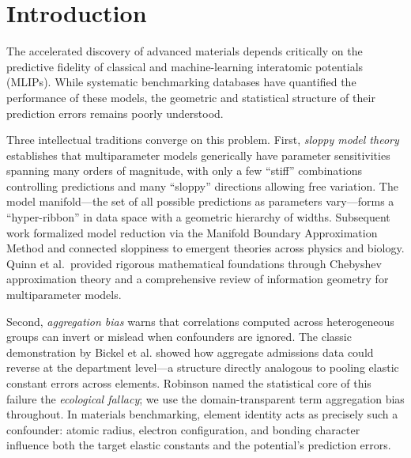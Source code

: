 \documentclass[twocolumn,9pt]{extarticle}
\begin{document}
\maketitle
\thispagestyle{fancy}



\section{Introduction}

The accelerated discovery of advanced materials depends critically on the predictive fidelity of classical and machine-learning interatomic potentials (MLIPs)\cite{frederiksen2004,mortensen2005}. While systematic benchmarking databases have quantified the performance of these models\cite{kurniawan2022,openkim,choudhary2017jarvisff,chiang2025mliparena}, the geometric and statistical structure of their prediction errors remains poorly understood.

Three intellectual traditions converge on this problem. First, \textit{sloppy model theory} establishes that multiparameter models generically have parameter sensitivities spanning many orders of magnitude, with only a few ``stiff'' combinations controlling predictions and many ``sloppy'' directions allowing free variation\cite{brown2003,waterfall2006,gutenkunst2007}. The model manifold---the set of all possible predictions as parameters vary---forms a ``hyper-ribbon'' in data space with a geometric hierarchy of widths\cite{transtrum2010,transtrum2011,machta2013}. Subsequent work formalized model reduction via the Manifold Boundary Approximation Method\cite{transtrum2014} and connected sloppiness to emergent theories across physics and biology\cite{transtrum2015}. Quinn et al.\ provided rigorous mathematical foundations through Chebyshev approximation theory\cite{quinn2019} and a comprehensive review of information geometry for multiparameter models\cite{quinn2023}.

Second, \textit{aggregation bias} warns that correlations computed across heterogeneous groups can invert or mislead when confounders are ignored\cite{simpson1951,blyth1972,pearl2014}. The classic demonstration by Bickel et al.\cite{bickel1975} showed how aggregate admissions data could reverse at the department level---a structure directly analogous to pooling elastic constant errors across elements. Robinson\cite{robinson1950} named the statistical core of this failure the \textit{ecological fallacy}; we use the domain-transparent term aggregation bias throughout. In materials benchmarking, element identity acts as precisely such a confounder: atomic radius, electron configuration, and bonding character influence both the target elastic constants and the potential's prediction errors\cite{pearl2009}.
\end{document}
